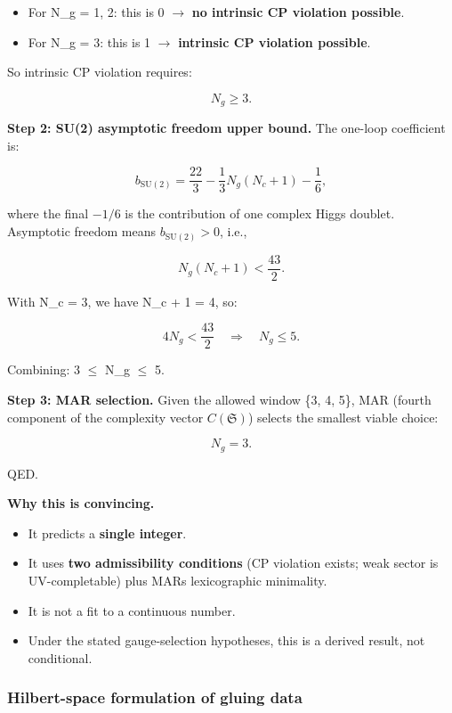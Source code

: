 \begin{itemize}
\tightlist
\item
  For N\_g = 1, 2: this is 0 \ensuremath{\to} \textbf{no intrinsic CP violation possible}.
\item
  For N\_g = 3: this is 1 \ensuremath{\to} \textbf{intrinsic CP violation possible}.
\end{itemize}

So intrinsic CP violation requires:

\[
N_g \ge 3.
\]

\textbf{Step 2: SU(2) asymptotic freedom upper bound.} The one-loop coefficient is:

\[
b_{\mathrm{SU}(2)} = \frac{22}{3} - \frac{1}{3}N_g(N_c + 1) - \frac{1}{6},
\]

where the final \(-1/6\) is the contribution of one complex Higgs doublet. Asymptotic freedom means \(b_{\mathrm{SU}(2)} > 0\), i.e.,

\[
N_g(N_c + 1) < \frac{43}{2}.
\]

With N\_c = 3, we have N\_c + 1 = 4, so:

\[
4 N_g < \frac{43}{2} \quad \Rightarrow \quad N_g \le 5.
\]

Combining: 3 \ensuremath{\leq} N\_g \ensuremath{\leq} 5.

\textbf{Step 3: MAR selection.} Given the allowed window \{3, 4, 5\}, MAR (fourth component of the complexity vector \(C(\mathfrak S)\)) selects the smallest viable choice:

\[
N_g = 3.
\]

QED.

\textbf{Why this is convincing.}

\begin{itemize}
\tightlist
\item
  It predicts a \textbf{single integer}.
\item
  It uses \textbf{two admissibility conditions} (CP violation exists; weak sector is UV-completable) plus MAR\textquotesingle s lexicographic minimality.
\item
  It is not a fit to a continuous number.
\item
  Under the stated gauge-selection hypotheses, this is a derived result, not conditional.
\end{itemize}

\subsubsection{Hilbert-space formulation of gluing data}\label{65-hilbert-space-formulation-of-gluing-data}

